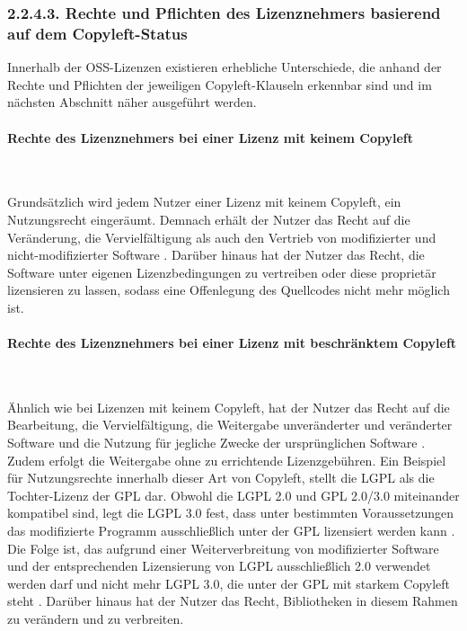 \subsubsection{2.2.4.3. Rechte und Pflichten des Lizenznehmers basierend auf dem Copyleft-Status}

Innerhalb der OSS-Lizenzen existieren erhebliche Unterschiede, die anhand der Rechte und Pflichten der jeweiligen Copyleft-Klauseln erkennbar sind und im nächsten Abschnitt näher ausgeführt werden. 

\paragraph{Rechte des Lizenznehmers bei einer Lizenz mit keinem Copyleft}$~$

Grundsätzlich wird jedem Nutzer einer Lizenz mit keinem Copyleft, ein Nutzungsrecht eingeräumt. Demnach erhält der Nutzer das Recht auf die Veränderung, die Vervielfältigung als auch den Vertrieb von modifizierter und nicht-modifizierter Software \cite[S. 14]{bitkom_open_nodate}. Darüber hinaus hat der Nutzer das Recht, die Software unter eigenen Lizenzbedingungen zu vertreiben oder diese proprietär lizensieren zu lassen, sodass eine Offenlegung des Quellcodes nicht mehr möglich ist.

\paragraph{Rechte des Lizenznehmers bei einer Lizenz mit beschränktem Copyleft}$~$

Ähnlich wie bei Lizenzen mit keinem Copyleft, hat der Nutzer das Recht auf die Bearbeitung, die Vervielfältigung, die Weitergabe unveränderter und veränderter Software und die Nutzung für jegliche Zwecke der ursprünglichen Software \cite[S. 11]{bitkom_open_nodate}. Zudem erfolgt die Weitergabe ohne zu errichtende Lizenzgebühren. Ein Beispiel für Nutzungsrechte innerhalb dieser Art von Copyleft, stellt die LGPL als die Tochter-Lizenz der GPL dar. Obwohl die LGPL 2.0 und GPL 2.0/3.0 miteinander kompatibel sind, legt die LGPL 3.0 fest, dass unter bestimmten Voraussetzungen das modifizierte Programm ausschließlich unter der GPL lizensiert werden kann \cite[S. 52]{schaaf_open-source-lizenzen_2013}. Die Folge ist, das aufgrund einer Weiterverbreitung von modifizierter Software und der entsprechenden Lizensierung von LGPL ausschließlich 2.0 verwendet werden darf und nicht mehr LGPL 3.0, die unter der GPL mit starkem Copyleft steht \cite[S. 52]{schaaf_open-source-lizenzen_2013}. Darüber hinaus hat der Nutzer das Recht, Bibliotheken in diesem Rahmen zu verändern und zu verbreiten. 

